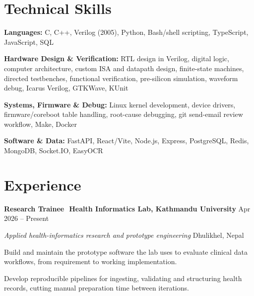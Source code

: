 \documentclass[10pt,letterpaper]{article}
\newcommand{\entry}[2]{%
  \needspace{3\baselineskip}\vspace{2.1pt}%
  {\bfseries\fontsize{10.1}{11.8}\selectfont #1}\hfill
  {\fontsize{9.1}{11}\selectfont\color{slate}#2}\par\vspace{0.4pt}}
\newcommand{\subentry}[2]{%
  {\fontsize{9.4}{11}\selectfont\itshape\color{deepnavy}#1}\hfill
  {\fontsize{9.1}{11}\selectfont\color{slate}#2}\par\vspace{0.8pt}}
\newcommand{\divider}{\textcolor{accentblue}{\,\textbar\,}}
\begin{document}
\section{Technical Skills}
\begin{tight}
  \item \textbf{Languages:} C, C++, Verilog (2005), Python, Bash/shell scripting, TypeScript, JavaScript, SQL
  \item \textbf{Hardware Design \& Verification:} RTL design in Verilog, digital logic, computer architecture, custom ISA and datapath design, finite-state machines, directed testbenches, functional verification, pre-silicon simulation, waveform debug, Icarus Verilog, GTKWave, KUnit
  \item \textbf{Systems, Firmware \& Debug:} Linux kernel development, device drivers, firmware/coreboot table handling, root-cause debugging, git send-email review workflow, Make, Docker
  \item \textbf{Software \& Data:} FastAPI, React/Vite, Node.js, Express, PostgreSQL, Redis, MongoDB, Socket.IO, EasyOCR
\end{tight}

\section{Experience}
\entry{Research Trainee \divider Health Informatics Lab, Kathmandu University}{Apr 2026 -- Present}
\subentry{Applied health-informatics research and prototype engineering}{Dhulikhel, Nepal}
\begin{tight}
  \item Build and maintain the prototype software the lab uses to evaluate clinical data workflows, from requirement to working implementation.
  \item Develop reproducible pipelines for ingesting, validating and structuring health records, cutting manual preparation time between iterations.
\end{tight}

\end{document}
